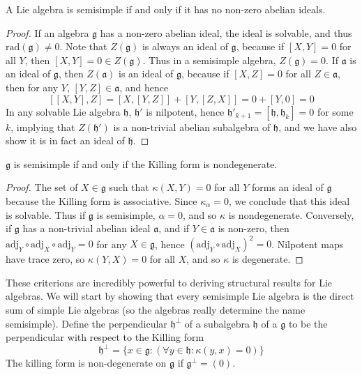 \begin{lemma}
    A Lie algebra is semisimple if and only if it has no non-zero abelian ideals.
\end{lemma}
\begin{proof}
    If an algebra $\mathfrak{g}$ has a non-zero abelian ideal, the ideal is solvable, and thus $\text{rad}(\mathfrak{g}) \neq 0$. Note that $Z(\mathfrak{g})$ is always an ideal of $\mathfrak{g}$, because if $[X,Y] = 0$ for all $Y$, then $[X,Y] = 0 \in Z(\mathfrak{g})$. Thus in a semisimple algebra, $Z(\mathfrak{g}) = 0$. If $\mathfrak{a}$ is an ideal of $\mathfrak{g}$, then $Z(\mathfrak{a})$ is an ideal of $\mathfrak{g}$, because if $[X,Z] = 0$ for all $Z \in \mathfrak{a}$, then for any $Y$, $[Y,Z] \in \mathfrak{a}$, and hence
    \[ [[X,Y],Z] = [X,[Y,Z]] + [Y,[Z,X]] = 0 + [Y,0] = 0 \]
    In any solvable Lie algebra $\mathfrak{h}$, $\mathfrak{h}'$ is nilpotent, hence $\mathfrak{h}'_{k+1} = [\mathfrak{h}, \mathfrak{h}_k] = 0$ for some $k$, implying that $Z(\mathfrak{h}')$ is a non-trivial abelian subalgebra of $\mathfrak{h}$, and we have also show it is in fact an ideal of $\mathfrak{h}$.
\end{proof}

\begin{theorem}
    $\mathfrak{g}$ is semisimple if and only if the Killing form is nondegenerate.
\end{theorem}
\begin{proof}
    The set of $X \in \mathfrak{g}$ such that $\kappa(X,Y) = 0$ for all $Y$ forms an ideal of $\mathfrak{g}$ because the Killing form is associative. Since $\kappa_\alpha = 0$, we conclude that this ideal is solvable. Thus if $\mathfrak{g}$ is semisimple, $\alpha = 0$, and so $\kappa$ is nondegenerate. Conversely, if $\mathfrak{g}$ has a non-trivial abelian ideal $\mathfrak{a}$, and if $Y \in \mathfrak{a}$ is non-zero, then $\text{adj}_Y \circ \text{adj}_X \circ \text{adj}_Y = 0$ for any $X \in \mathfrak{g}$, hence $(\text{adj}_Y \circ \text{adj}_X)^2 = 0$. Nilpotent maps have trace zero, so $\kappa(Y,X) = 0$ for all $X$, and so $\kappa$ is degenerate.
\end{proof}

These criterions are incredibly powerful to deriving structural results for Lie algebras. We will start by showing that every semisimple Lie algebra is the direct sum of simple Lie algebras (so the algebras really determine the name semisimple). Define the perpendicular $\mathfrak{h}^\perp$ of a subalgebra $\mathfrak{h}$ of a $\mathfrak{g}$ to be the perpendicular with respect to the Killing form
%
\[ \mathfrak{h}^\perp = \{ x \in \mathfrak{g} : (\forall y \in \mathfrak{h}: \kappa(y,x) = 0) \} \]
%
The killing form is non-degenerate on $\mathfrak{g}$ if $\mathfrak{g}^\perp = (0)$.

